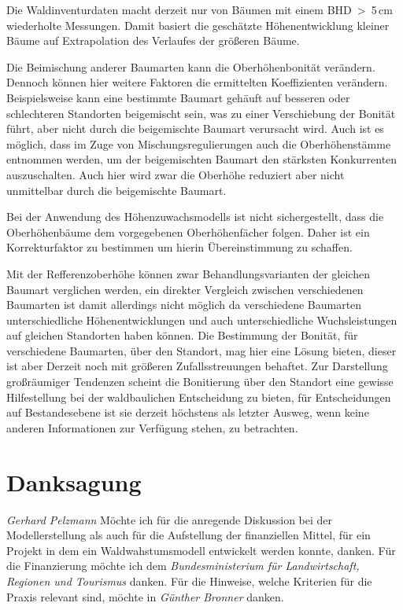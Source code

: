 \documentclass[twocolumn]{scrartcl}
\begin{document}
Die Waldinventurdaten macht derzeit nur von Bäumen mit einem
BHD~>~5\,cm wiederholte Messungen. Damit basiert die geschätzte
Höhenentwicklung kleiner Bäume auf Extrapolation des Verlaufes der
größeren Bäume.

Die Beimischung anderer Baumarten kann die Oberhöhenbonität
verändern. Dennoch können hier weitere Faktoren die ermittelten
Koeffizienten verändern. Beispielsweise kann eine bestimmte Baumart
gehäuft auf besseren oder schlechteren Standorten beigemischt sein,
was zu einer Verschiebung der Bonität führt, aber nicht durch die
beigemischte Baumart verursacht wird. Auch ist es möglich, dass im
Zuge von Mischungsregulierungen auch die Oberhöhenstämme entnommen
werden, um der beigemischten Baumart den stärksten Konkurrenten
auszuschalten. Auch hier wird zwar die Oberhöhe reduziert aber nicht
unmittelbar durch die beigemischte Baumart.

Bei der Anwendung des Höhenzuwachsmodells ist nicht sichergestellt,
dass die Oberhöhenbäume dem vorgegebenen Oberhöhenfächer folgen. Daher
ist ein Korrekturfaktor zu bestimmen um hierin Übereinstimmung zu
schaffen.

Mit der Refferenzoberhöhe können zwar Behandlungsvarianten der
gleichen Baumart verglichen werden, ein direkter Vergleich zwischen
verschiedenen Baumarten ist damit allerdings nicht möglich da
verschiedene Baumarten unterschiedliche Höhenentwicklungen und auch
unterschiedliche Wuchsleistungen auf gleichen Standorten haben
können. Die Bestimmung der Bonität, für verschiedene Baumarten, über
den Standort, mag hier eine Lösung bieten, dieser ist aber Derzeit
noch mit größeren Zufallsstreuungen behaftet. Zur Darstellung
großräumiger Tendenzen scheint die Bonitierung über den Standort eine
gewisse Hilfestellung bei der waldbaulichen Entscheidung zu bieten,
für Entscheidungen auf Bestandesebene ist sie derzeit höchstens als
letzter Ausweg, wenn keine anderen Informationen zur Verfügung stehen,
zu betrachten.

\section*{Danksagung}

\emph{Gerhard Pelzmann} Möchte ich für die anregende Diskussion bei
der Modellerstellung als auch für die Aufstellung der finanziellen
Mittel, für ein Projekt in dem ein Waldwahstumsmodell entwickelt werden
konnte, danken. Für die Finanzierung möchte ich dem
\emph{Bundesministerium für Landwirtschaft, Regionen und Tourismus}
danken. Für die Hinweise, welche Kriterien für die Praxis relevant
sind, möchte in \emph{Günther Bronner} danken.



\end{document}
